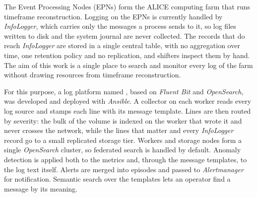 The Event Processing Nodes (EPNs) form the ALICE computing farm that runs timeframe reconstruction. Logging on the EPNs is currently handled by \textit{InfoLogger}, which carries only the messages a process sends to it, so log files written to disk and the system journal are never collected. The records that do reach \textit{InfoLogger} are stored in a single central table, with no aggregation over time, one retention policy and no replication, and shifters inspect them by hand. The aim of this work is a single place to search and monitor every log of the farm without drawing resources from timeframe reconstruction.

For this purpose, a log platform named \loggy{}, based on \textit{Fluent Bit} and \textit{OpenSearch}, was developed and deployed with \textit{Ansible}. A collector on each worker reads every log source and stamps each line with its message template. Lines are then routed by severity: the bulk of the volume is indexed on the worker that wrote it and never crosses the network, while the lines that matter and every \textit{InfoLogger} record go to a small replicated storage tier. Workers and storage nodes form a single \textit{OpenSearch} cluster, so federated search is handled by default. Anomaly detection is applied both to the metrics and, through the message templates, to the log text itself. Alerts are merged into episodes and passed to \textit{Alertmanager} for notification. Semantic search over the templates lets an operator find a message by its meaning.

